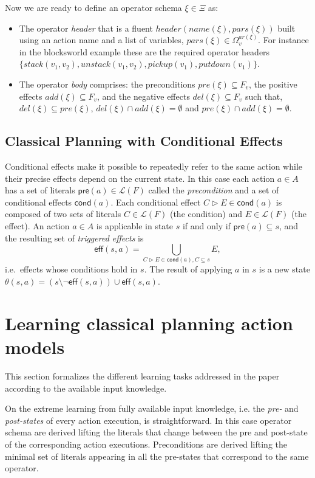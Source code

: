 \documentclass[letterpaper]{article} %
\newcommand{\pre}{\mathsf{pre}}     %
\newcommand{\eff}{\mathsf{eff}}     %
\newcommand{\cond}{\mathsf{cond}}   %
\begin{document}
Now we are ready to define an operator schema $\xi\in \Xi$ as:
\begin{itemize}
\item The operator {\em header} that is a fluent $header(name(\xi),pars(\xi))$ built using an action name and a list of variables, $pars(\xi)\in\Omega_v^{ar(\xi)}$. For instance in the blocksworld example these are the required operator headers $\{stack(v_1,v_2), unstack(v_1,v_2), pickup(v_1), putdown(v_1)\}$.
\item The operator {\em body} comprises: the preconditions $pre(\xi)\subseteq F_v$, the positive effects $add(\xi)\subseteq F_v$, and the negative effects $del(\xi)\subseteq F_v$ such that, $del(\xi)\subseteq pre(\xi)$, $del(\xi)\cap add(\xi)=\emptyset$ and $pre(\xi)\cap add(\xi)=\emptyset$.
\end{itemize}


\subsection{Classical Planning with Conditional Effects}
Conditional effects make it possible to repeatedly refer to the same action while their precise effects depend on the current state. In this case each action $a\in A$ has a set of literals $\pre(a)\in\mathcal{L}(F)$ called the {\em precondition} and a set of conditional effects $\cond(a)$. Each conditional effect $C\rhd E\in\cond(a)$ is composed of two sets of literals $C\in\mathcal{L}(F)$ (the condition) and $E\in\mathcal{L}(F)$ (the effect). An action $a\in A$ is applicable in state $s$ if and only if $\pre(a)\subseteq s$, and the resulting set of {\em triggered effects} is
\[
\eff(s,a)=\bigcup_{C\rhd E\in\cond(a),C\subseteq s} E,
\]
i.e.~effects whose conditions hold in $s$. The result of applying $a$ in $s$ is a new state $\theta(s,a)=(s\setminus \neg\eff(s,a))\cup\eff(s,a)$.


\section{Learning classical planning action models}
This section formalizes the different learning tasks addressed in the paper according to the available input knowledge.

On the extreme learning from fully available input knowledge, i.e. the {\em pre-} and {\em post-states} of every action execution, is straightforward. In this case operator schema are derived lifting the literals that change between the pre and post-state of the corresponding action executions. Preconditions are derived lifting the minimal set of literals appearing in all the pre-states that correspond to the same operator.
\end{document}
